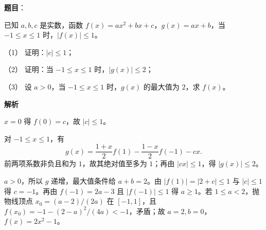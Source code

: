 \begin{answer}

\textbf{题目}：

已知 $a,b,c$ 是实数，函数 $f(x)=ax^2+bx+c$，$g(x)=ax+b$，当 $-1\le x\le1$ 时，$|f(x)|\le1$。

（1） 证明：$|c|\le1$；

（2） 证明：当 $-1\le x\le1$ 时，$|g(x)|\le2$；

（3） 设 $a>0$，当 $-1\le x\le1$ 时，$g(x)$ 的最大值为 $2$，求 $f(x)$。

\textbf{解析}


$x=0$ 得 $f(0)=c$，故 $|c|\le1$。


对 $-1\le x\le1$，有
\nopagebreak[4]
\[
g(x)=\frac{1+x}{2}f(1)-\frac{1-x}{2}f(-1)-cx.
\]
前两项系数非负且和为 $1$，故其绝对值至多为 $1$；再由 $|cx|\le1$，得 $|g(x)|\le2$。


$a>0$，所以 $g$ 递增，最大值条件给 $a+b=2$。由 $|f(1)|=|2+c|\le1$ 与 $|c|\le1$ 得 $c=-1$。再由 $f(-1)=2a-3$ 且 $|f(-1)|\le1$ 得 $a\ge1$。若 $1\le a<2$，抛物线顶点 $x_0=(a-2)/(2a)$ 在 $[-1,1]$，且 $f(x_0)=-1-(2-a)^2/(4a)<-1$，矛盾；故 $a=2,b=0$，$f(x)=2x^2-1$。




\end{answer}